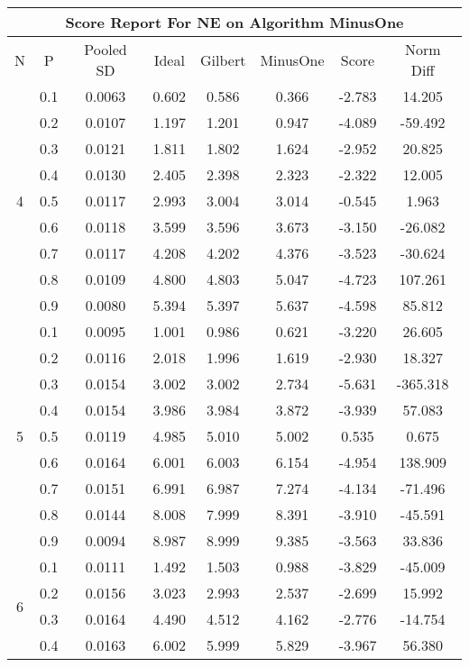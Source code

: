 \documentclass[11pt,a4paper]{report}
\begin{document}
\begin{longtable}{ | c | c || c | c | c | c | c | c | }
\hline
\multicolumn{8}{|c|}{ Score Report For NE on Algorithm MinusOne} \\
\hline
N & P & Pooled SD &  Ideal &  Gilbert & MinusOne  & Score & Norm Diff \\
 \hline
 \hline
 \endhead
\multirow{9}{*}{4} & 0.1 & 0.0063 & 0.602 & 0.586 & 0.366 & -2.783 & 14.205 \\
 & 0.2 & 0.0107 & 1.197 & 1.201 & 0.947 & -4.089 & -59.492 \\
 & 0.3 & 0.0121 & 1.811 & 1.802 & 1.624 & -2.952 & 20.825 \\
 & 0.4 & 0.0130 & 2.405 & 2.398 & 2.323 & -2.322 & 12.005 \\
 & 0.5 & 0.0117 & 2.993 & 3.004 & 3.014 & -0.545 & 1.963 \\
 & 0.6 & 0.0118 & 3.599 & 3.596 & 3.673 & -3.150 & -26.082 \\
 & 0.7 & 0.0117 & 4.208 & 4.202 & 4.376 & -3.523 & -30.624 \\
 & 0.8 & 0.0109 & 4.800 & 4.803 & 5.047 & -4.723 & 107.261 \\
 & 0.9 & 0.0080 & 5.394 & 5.397 & 5.637 & -4.598 & 85.812 \\
 \hline
\multirow{9}{*}{5} & 0.1 & 0.0095 & 1.001 & 0.986 & 0.621 & -3.220 & 26.605 \\
 & 0.2 & 0.0116 & 2.018 & 1.996 & 1.619 & -2.930 & 18.327 \\
 & 0.3 & 0.0154 & 3.002 & 3.002 & 2.734 & -5.631 & -365.318 \\
 & 0.4 & 0.0154 & 3.986 & 3.984 & 3.872 & -3.939 & 57.083 \\
 & 0.5 & 0.0119 & 4.985 & 5.010 & 5.002 & 0.535 & 0.675 \\
 & 0.6 & 0.0164 & 6.001 & 6.003 & 6.154 & -4.954 & 138.909 \\
 & 0.7 & 0.0151 & 6.991 & 6.987 & 7.274 & -4.134 & -71.496 \\
 & 0.8 & 0.0144 & 8.008 & 7.999 & 8.391 & -3.910 & -45.591 \\
 & 0.9 & 0.0094 & 8.987 & 8.999 & 9.385 & -3.563 & 33.836 \\
 \hline
\multirow{9}{*}{6} & 0.1 & 0.0111 & 1.492 & 1.503 & 0.988 & -3.829 & -45.009 \\
 & 0.2 & 0.0156 & 3.023 & 2.993 & 2.537 & -2.699 & 15.992 \\
 & 0.3 & 0.0164 & 4.490 & 4.512 & 4.162 & -2.776 & -14.754 \\
 & 0.4 & 0.0163 & 6.002 & 5.999 & 5.829 & -3.967 & 56.380 \\

\end{longtable}
\end{document}
